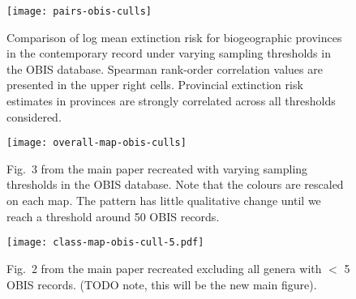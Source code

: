 \documentclass[11pt]{article}
\begin{document}
\clearpage

%


\clearpage

\begin{figure}[htbp]
\begin{center}
\texttt{[image: pairs-obis-culls]}
\caption{Comparison of log mean extinction risk for biogeographic provinces in the contemporary record under varying sampling thresholds in the OBIS database. Spearman rank-order correlation values are presented in the upper right cells. Provincial extinction risk estimates in provinces are strongly correlated across all thresholds considered.}
\label{fig:pairs-prov-obis-culls}
\end{center}
\end{figure}

\clearpage

\begin{figure}[htbp]
\begin{center}
\texttt{[image: overall-map-obis-culls]}
\caption{Fig.~3 from the main paper recreated with varying sampling thresholds in the OBIS database. Note that the colours are rescaled on each map. The pattern has little qualitative change until we reach a threshold around 50 OBIS records.}
\label{fig:overall-maps-obis-culls}
\end{center}
\end{figure}

\begin{figure}[htbp]
\begin{center}
  \texttt{[image: class-map-obis-cull-5.pdf]}
\caption{Fig.~2 from the main paper recreated excluding all genera with $<$ 5 OBIS records. (TODO note, this will be the new main figure).}
\label{fig:class-map-obis-cull-5}
\end{center}
\end{figure}
\end{document}
